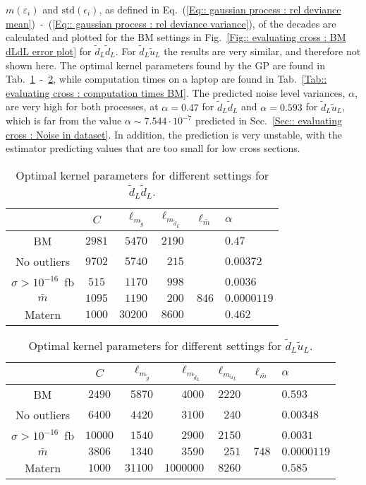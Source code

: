 \documentclass[twoside,english]{uiofysmaster}
\begin{document}
$m(\varepsilon_i)$ and $\text{std}(\epsilon_i)$, as defined in Eq.~(\ref{Eq:: gaussian process : rel deviance mean})~-~(\ref{Eq:: gaussian process : rel deviance variance}), of the decades are calculated  and plotted for the BM settings in Fig.~\ref{Fig:: evaluating cross : BM dLdL error plot} for $\tilde{d}_L \tilde{d}_L$. For $\tilde{d}_L \tilde{u}_L$  the results are very similar, and therefore not shown here. The optimal kernel parameters  found by the GP are found in Tab.\ \ref{Tab:: evaluating cross : optimal kernels dLdL}~-~\ref{Tab:: evaluating cross : optimal kernels dLuL}, while computation times on a laptop are found in Tab.\ \ref{Tab:: evaluating cross : computation times BM}. The predicted noise level variances, $\alpha$, are very high for both processes, at $\alpha=0.47$ for $\tilde{d}_L \tilde{d}_L$ and $\alpha=0.593$ for $\tilde{d}_L \tilde{u}_L$, which is far from the value $\alpha \sim 7.544 \cdot 10^{-7}$ predicted in Sec.~\ref{Sec:: evaluating cross : Noise in dataset}. In addition, the prediction is very unstable, with the estimator predicting values that are too small for low cross sections.

\begin{table}
\centering
\begin{tabular}{@{}ccrrrl@{}} \toprule
 & $C$ & $\ell_{m_{\tilde{g}}}$ & $\ell_{m_{\tilde{d}_L}}$ & $\ell_{\bar{m}}$ & $\alpha$\\ \midrule
BM & $2981$ & $5470 $& $ 2190$ & & $0.47$\\
No outliers & $9702 $ & $5740$ & $215$ & & $0.00372$\\
$\sigma > 10^{-16}$~fb & $515$ & $1170$&  $998$ && $0.0036$\\
$\bar{m}$ & $1095$ & $1190$ & $200$ & $846$ & $0.0000119$\\
Matern & $1000$ & $30200$ & $8600$ && $0.462$\\ \bottomrule
\end{tabular}
\caption{Optimal kernel parameters for different settings for $\tilde{d}_L \tilde{d}_L$.}
\label{Tab:: evaluating cross : optimal kernels dLdL}
\end{table}

\begin{table}
\centering
\begin{tabular}{@{}ccrrrrl@{}} \toprule
 & $C$ & $\ell_{m_{\tilde{g}}}$ & $\ell_{m_{\tilde{d}_L}}$ & $\ell_{m_{\tilde{u}_L}}$ & $\ell_{\bar{m}}$ &$\alpha$\\ \midrule
BM & $2490$ & $5870$&$ 4000$&$ 2220$ && $0.593$ \\
No outliers & $6400$ & $4420$ & $3100$ & $240$ && $0.00348$\\ 
$\sigma > 10^{-16}$~fb & $10000$ & $1540$ & $2900$ & $2150$ && $0.0031$\\
$\bar{m}$ &  $3806$ & $1340$ & $3590$ & $251$ & $748$ & $0.0000119$\\
Matern & $1000$ & $31100$ & $1000000$ & $8260$ && $0.585$\\ \bottomrule
\end{tabular}
\caption{Optimal kernel parameters for different settings for $\tilde{d}_L \tilde{u}_L$.}
\label{Tab:: evaluating cross : optimal kernels dLuL}
\end{table}
\end{document}
